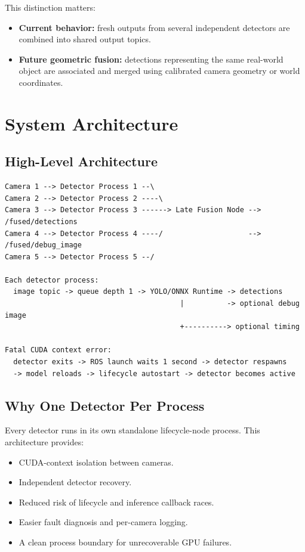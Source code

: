\documentclass[11pt,a4paper]{article}
\begin{document}
This distinction matters:

\begin{itemize}
  \item \textbf{Current behavior:} fresh outputs from several independent detectors are combined into shared output topics.
  \item \textbf{Future geometric fusion:} detections representing the same real-world object are associated and merged using calibrated camera geometry or world coordinates.
\end{itemize}

\section{System Architecture}

\subsection{High-Level Architecture}

\begin{lstlisting}
Camera 1 --> Detector Process 1 --\
Camera 2 --> Detector Process 2 ----\
Camera 3 --> Detector Process 3 ------> Late Fusion Node --> /fused/detections
Camera 4 --> Detector Process 4 ----/                    --> /fused/debug_image
Camera 5 --> Detector Process 5 --/

Each detector process:
  image topic -> queue depth 1 -> YOLO/ONNX Runtime -> detections
                                         |          -> optional debug image
                                         +----------> optional timing

Fatal CUDA context error:
  detector exits -> ROS launch waits 1 second -> detector respawns
  -> model reloads -> lifecycle autostart -> detector becomes active
\end{lstlisting}

\subsection{Why One Detector Per Process}

Every detector runs in its own standalone lifecycle-node process. This architecture provides:

\begin{itemize}
  \item CUDA-context isolation between cameras.
  \item Independent detector recovery.
  \item Reduced risk of lifecycle and inference callback races.
  \item Easier fault diagnosis and per-camera logging.
  \item A clean process boundary for unrecoverable GPU failures.
\end{itemize}
\end{document}
